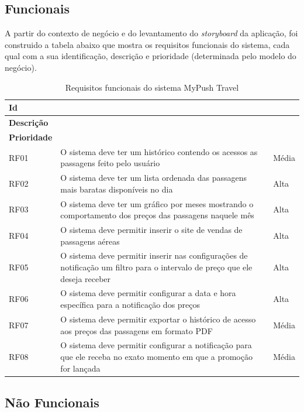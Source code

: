 \subsection{Funcionais}

A partir do contexto de negócio e do levantamento do \textit{storyboard} da aplicação, foi construido a tabela abaixo que mostra os requisitos funcionais do sistema, cada qual com a sua identificação, descrição e prioridade (determinada pelo modelo do negócio).

\begin{table}[H]
	\centering
	\begin{tabular}{lll}
		\toprule
			\textbf{Id} & \\ \hline
			\textbf{Descrição} & \\ \hline
			\textbf{Prioridade} \\ \hline
		\midrule
			RF01 & O sistema deve ter um histórico contendo os acessos as passagens feito pelo usuário & Média \\ \hline
			RF02 & O sistema deve ter um lista ordenada das passagens mais baratas disponíveis no dia & Alta \\ \hline
			RF03 & O sistema deve ter um gráfico por meses mostrando o comportamento dos preços das passagens naquele mês & Alta \\ \hline
			RF04 & O sistema deve permitir inserir o site de vendas de passagens aéreas & Alta \\ \hline
			RF05 & O sistema deve permitir inserir nas configurações de notificação um filtro para o intervalo de preço que ele deseja receber & Alta \\ \hline
			RF06 & O sistema deve permitir configurar a data e hora específica para a notificação dos preços & Alta \\ \hline
			RF07 & O sistema deve permitir exportar o histórico de acesso aos preços das passagens em formato PDF & Média \\ \hline
			RF08 & O sistema deve permitir configurar a notificação para que ele receba no exato momento em que a promoção for lançada & Média \\ \hline
		\bottomrule
	\end{tabular}
	\caption{Requisitos funcionais do sistema MyPush Travel}
	\label{tab01}
\end{table}

\subsection{Não Funcionais}

